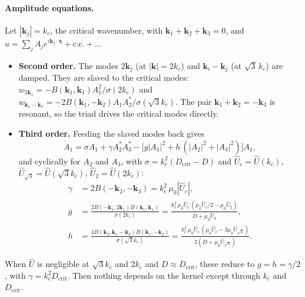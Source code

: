 \documentclass[11pt]{article}
\newcommand{\Uh}{\hat U}
\begin{document}
\paragraph{Amplitude equations.} Let $|\mathbf k_j| = k_c$, the critical
wavenumber, with $\mathbf k_1+\mathbf k_2+\mathbf k_3=0$, and
$u = \sum_j A_j e^{i\mathbf k_j\cdot\mathbf x} + \text{c.c.} + \dots$
\begin{itemize}
  \item \textbf{Second order.} The modes $2\mathbf k_j$ (at $|\mathbf k| =
        2k_c$) and $\mathbf k_i-\mathbf k_j$ (at $\sqrt3\,k_c$) are damped. They
        are slaved to the critical modes:
        $w_{2\mathbf k_1} = -B(\mathbf k_1,\mathbf k_1)A_1^2/\sigma(2k_c)$ and
        $w_{\mathbf k_1-\mathbf k_2} = -2B(\mathbf k_1,-\mathbf k_2)A_1A_2^*/\sigma(\sqrt3k_c)$.
        The pair $\mathbf k_1+\mathbf k_2 = -\mathbf k_3$ is resonant, so the
        triad drives the critical modes directly.
  \item \textbf{Third order.} Feeding the slaved modes back gives
        \begin{equation}
          \dot A_1 = \sigma A_1 + \gamma A_2^*A_3^*
            - \bigl[g|A_1|^2 + h\,(|A_2|^2+|A_3|^2)\bigr]A_1,
        \end{equation}
        and cyclically for $A_2$ and $A_3$, with $\sigma = k_c^2(D_{\mathrm{crit}}-D)$
        and $\Uh_c = \Uh(k_c)$, $\Uh_{\sqrt3} = \Uh(\sqrt3k_c)$,
        $\Uh_2 = \Uh(2k_c)$:
        \begin{align}
          \gamma &= 2B(-\mathbf k_2,-\mathbf k_3) = k_c^2\,\mu_0|\Uh_c|, \\
          g &= \frac{2B(-\mathbf k_1,2\mathbf k_1)B(\mathbf k_1,\mathbf k_1)}{\sigma(2k_c)}
             = \frac{k_c^2\,\mu_0\Uh_c\,(\mu_0\Uh_c/2-\mu_0\Uh_2)}{D+\mu_0\Uh_2}, \\
          h &= \frac{4B(\mathbf k_2,\mathbf k_1-\mathbf k_2)B(\mathbf k_1,-\mathbf k_2)}{\sigma(\sqrt3k_c)}
             = \frac{k_c^2\,\mu_0\Uh_c\,(\mu_0\Uh_c-3\mu_0\Uh_{\sqrt3})}{2(D+\mu_0\Uh_{\sqrt3})} .
        \end{align}
\end{itemize}
When $\Uh$ is negligible at $\sqrt3k_c$ and $2k_c$ and $D\approx D_{\mathrm{crit}}$,
these reduce to $g = h = \gamma/2$, with
$\gamma = k_c^2 D_{\mathrm{crit}}$. Then nothing depends on the kernel except
through $k_c$ and $D_{\mathrm{crit}}$.
\end{document}
